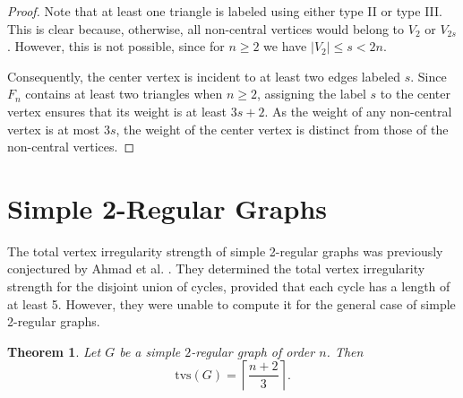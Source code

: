 \documentclass[11pt]{article}
\newtheorem{thm}{Theorem}[section]
\numberwithin{equation}{section}
\newcommand{\tvs}{\mathrm{tvs}}
\begin{document}
\begin{proof}
Note that at least one triangle is labeled using either type II or type III. This is clear because, otherwise, all non-central vertices would belong to \(V_2\) or \(V_{2s}\). However, this is not possible, since for \(n \geq 2\) we have \(|V_2| \leq s < 2n\).

Consequently, the center vertex is incident to at least two edges labeled \(s\). Since \(F_n\) contains at least two triangles when \(n \geq 2\), assigning the label \(s\) to the center vertex ensures that its weight is at least \(3s + 2\). As the weight of any non-central vertex is at most \(3s\), the weight of the center vertex is distinct from those of the non-central vertices.
\end{proof}
\section{Simple 2-Regular Graphs}
The total vertex irregularity strength of simple 2-regular graphs was previously conjectured by Ahmad et al. \cite{ahmadIrregularTotalLabeling}. They determined the total vertex irregularity strength for the disjoint union of cycles, provided that each cycle has a length of at least 5. However, they were unable to compute it for the general case of simple 2-regular graphs.

\begin{thm}
Let $G$ be a simple $2$-regular graph of order $n$. Then
\[
\tvs(G)=\left \lceil \frac{n+2}{3}\right\rceil.
\]
\end{thm}
\end{document}
